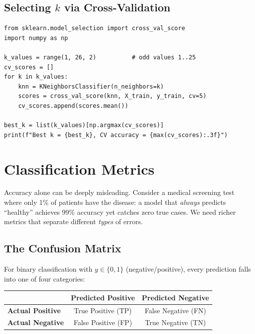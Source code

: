 \subsection*{Selecting $k$ via Cross-Validation}

\begin{lstlisting}[style=pythonstyle]
from sklearn.model_selection import cross_val_score
import numpy as np

k_values = range(1, 26, 2)          # odd values 1..25
cv_scores = []
for k in k_values:
    knn = KNeighborsClassifier(n_neighbors=k)
    scores = cross_val_score(knn, X_train, y_train, cv=5)
    cv_scores.append(scores.mean())

best_k = list(k_values)[np.argmax(cv_scores)]
print(f"Best k = {best_k}, CV accuracy = {max(cv_scores):.3f}")
\end{lstlisting}


\section*{Classification Metrics}

Accuracy alone can be deeply misleading. Consider a medical screening test where only 1\% of patients have the disease: a model that \textit{always} predicts ``healthy'' achieves 99\% accuracy yet catches zero true cases. We need richer metrics that separate different \textit{types} of errors.

\subsection*{The Confusion Matrix}

For binary classification with $y \in \{0, 1\}$ (negative/positive), every prediction falls into one of four categories:

\begin{center}
\renewcommand{\arraystretch}{1.4}
\begin{tabular}{l|cc}
 & \textbf{Predicted Positive} & \textbf{Predicted Negative} \\
\hline
\textbf{Actual Positive} & True Positive (TP)  & False Negative (FN) \\
\textbf{Actual Negative} & False Positive (FP) & True Negative (TN) \\
\end{tabular}
\end{center}

